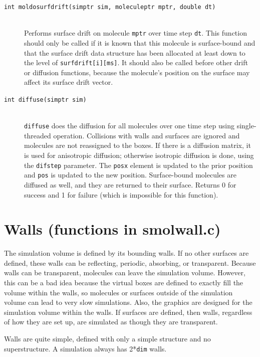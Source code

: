 \documentclass {scrbook}
\newcommand {\ttt} {\texttt}
\begin{document}
\begin{description}
\item[\ttt{int moldosurfdrift(simptr sim, moleculeptr mptr, double dt)}]
\hfill \\
Performs surface drift on molecule \ttt{mptr} over time step \ttt{dt}. This function should only be called if it is known that this molecule is surface-bound and that the surface drift data structure has been allocated at least down to the level of \ttt{surfdrift[i][ms]}. It should also be called before other drift or diffusion functions, because the molecule's position on the surface may affect its surface drift vector.

\item[\ttt{int diffuse(simptr sim)}]
\hfill \\
\ttt{diffuse} does the diffusion for all molecules over one time step using single-threaded operation. Collisions with walls and surfaces are ignored and molecules are not reassigned to the boxes. If there is a diffusion matrix, it is used for anisotropic diffusion; otherwise isotropic diffusion is done, using the \ttt{difstep} parameter. The \ttt{posx} element is updated to the prior position and \ttt{pos} is updated to the new position. Surface-bound molecules are diffused as well, and they are returned to their surface. Returns 0 for success and 1 for failure (which is impossible for this function).

\end{description}

\section{Walls (functions in smolwall.c)}

The simulation volume is defined by its bounding walls. If no other surfaces are defined, these walls can be reflecting, periodic, absorbing, or transparent. Because walls can be transparent, molecules can leave the simulation volume. However, this can be a bad idea because the virtual boxes are defined to exactly fill the volume within the walls, so molecules or surfaces outside of the simulation volume can lead to very slow simulations. Also, the graphics are designed for the simulation volume within the walls. If surfaces are defined, then walls, regardless of how they are set up, are simulated as though they are transparent.

Walls are quite simple, defined with only a simple structure and no superstructure. A simulation always has 2*\ttt{dim} walls.
\end{document}
